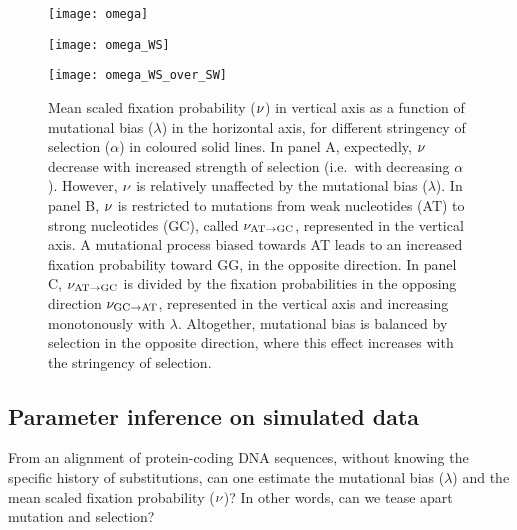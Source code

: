 \begin{figure}[h]
    \centering
    \begin{minipage}{0.32\linewidth}
        \texttt{[image: omega]}
    \end{minipage}
    \hfill
    \begin{minipage}{0.32\linewidth}
        \texttt{[image: omega\_WS]}
    \end{minipage}
    \hfill
    \begin{minipage}{0.32\linewidth}
        \texttt{[image: omega\_WS\_over\_SW]}
    \end{minipage}
    \hfill
    \caption[Mean scaled fixation probability as a function of the parameters]{
    Mean scaled fixation probability ($\nu$) in vertical axis as a function of mutational bias ($\lambda$) in the horizontal axis, for different stringency of selection ($\alpha$) in coloured solid lines.
    In panel A, expectedly, $\nu$ decrease with increased strength of selection (i.e.~with decreasing $\alpha$).
    However, $\nu$ is relatively unaffected by the mutational bias ($\lambda$).
    In panel B, $\nu$ is restricted to mutations from weak nucleotides (AT) to strong nucleotides (GC), called $\nu_{\text{AT} \rightarrow \text{GC}}$, represented in the vertical axis.
    A mutational process biased towards AT leads to an increased fixation probability toward GG, in the opposite direction.
    In panel C, $\nu_{\text{AT} \rightarrow \text{GC}}$ is divided by the fixation probabilities in the opposing direction $\nu_{\text{GC} \rightarrow \text{AT}}$, represented in the vertical axis and increasing monotonously with $\lambda$.
    Altogether, mutational bias is balanced by selection in the opposite direction, where this effect increases with the stringency of selection.
    }
    \label{fig:mut-bias-omega-WS}
\end{figure}

\subsection{Parameter inference on simulated data}
\label{subsec:parameter-inference-on-simulated-data}

From an alignment of protein-coding \acrshort{DNA} sequences, without knowing the specific history of \glspl{substitution}, can one estimate the mutational bias ($\lambda$) and the mean scaled fixation probability ($\nu$)?
In other words, can we tease apart mutation and selection?

